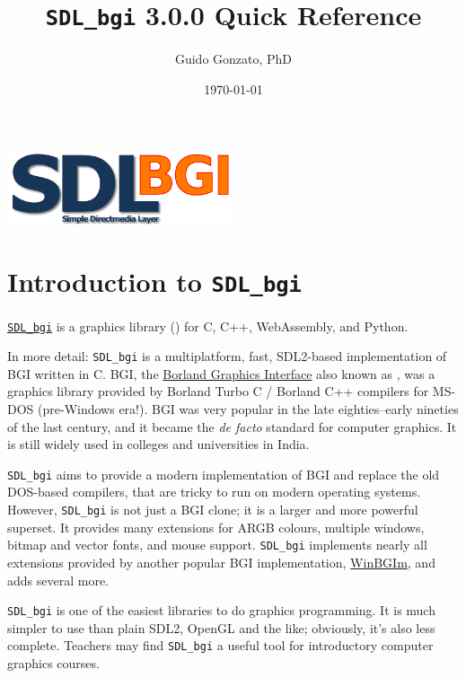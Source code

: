 \documentclass[a4paper,12pt]{article}
\newcommand{\version}{3.0.0}        %
\newcommand{\ntt}[1]{\texttt{\textls[-40]{#1}}}
\newcommand{\T}[1]{\ntt{#1}}     %
\newcommand{\SDLbgi}{\texttt{SDL\_bgi}}
\begin{document}
\title{\SDLbgi{} \version{} Quick Reference}


\author{Guido Gonzato, PhD}

\date{\today}

\maketitle

\begin{center}
  \includegraphics[width=0.5\textwidth]{SDL_bgi_logo.png}
\end{center}

{\small \tableofcontents}


\section{Introduction to \SDLbgi}

\href{https://sdl-bgi.sourceforge.io}{\SDLbgi} is a graphics library
(\ntt{GRAPHICS.H}) for C, C++, WebAssembly, and Python.

In more detail: \SDLbgi{} is a multiplatform, fast, SDL2-based
implementation of BGI written in C. BGI, the
\href{https://en.wikipedia.org/wiki/Borland_Graphics_Interface}
{Borland Graphics Interface} also known as \T{GRAPHICS.H}, was a
graphics library provided by Borland Turbo C / Borland C++ compilers
for MS-DOS (pre-Windows era!). BGI was very popular in the late
eighties--early nineties of the last century, and it became the
\emph{de facto} standard for computer graphics. It is still widely
used in colleges and universities in India.

\SDLbgi{} aims to provide a modern implementation of BGI and replace
the old DOS-based compilers, that are tricky to run on modern
operating systems. However, \SDLbgi{} is not just a BGI clone; it is a
larger and more powerful superset. It provides many extensions for
ARGB colours, multiple windows, bitmap and vector fonts, and mouse
support. \SDLbgi{} implements nearly all extensions provided by
another popular BGI implementation,
\href{https://winbgim.codecutter.org/}{WinBGIm}, and adds several
more.

\SDLbgi{} is one of the easiest libraries to do graphics programming.
It is much simpler to use than plain SDL2, OpenGL and the like;
obviously, it's also less complete. Teachers may find \SDLbgi{} a
useful tool for introductory computer graphics courses.
\end{document}
